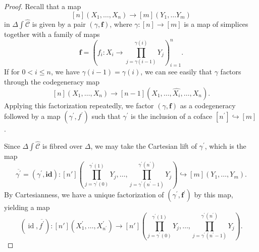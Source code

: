 \documentclass[leqno]{article}
\numberwithin{equation}{subsection}
\theoremstyle{plain}   %
\theoremstyle{remark}
\theoremstyle{plain}
\DeclareMathOperator{\id}{id}
\newcommand{\psh}[1]{\ensuremath{\widehat{#1}}}
\providecommand{\C}{}
\renewcommand{\C}{\ensuremath{\mathcal{C}}}
\begin{document}
\begin{proof}
	Recall that a map \[[n](X_1,\dots, X_n) \to [m](Y_1,\dots Y_m)\] in \(\Delta \int \psh{\C}\) is given by a pair \((\gamma,	\mathbf{f})\), where \(\gamma:[n]\to [m]\) is a map of simplices together with a family of maps \[\mathbf{f}=\left(f_i: 	X_i \to \prod_{j=\gamma(i-1)}^{\gamma(i)}Y_j\right)_{i=1}^n.\]
	If for \(0<i\leq n\), we have \(\gamma(i-1)=\gamma(i)\), we can see easily that \(\gamma\) factors through the 	codegeneracy map \[[n](X_1,\dots,X_n)\to [n-1](X_1,\dots,\psh{X_i},\dots,X_n).\]  Applying this factorization repeatedly, 	we factor \((\gamma,\mathbf{f})\) as a codegeneracy followed by a map \((\gamma^\prime,f^\prime)\) such that \(\gamma^\prime\) is the inclusion of a coface \([n^\prime]\hookrightarrow [m]\).

	Since \(\Delta\int \psh{\C}\) is fibred over \(\Delta\), we may take the Cartesian lift of \(\gamma^\prime\), which is 	the map \[\overline{\gamma^\prime}=(\gamma^\prime,\mathbf{id}):[n']\left(\prod_{j=\gamma^\prime(0)}^{\gamma^\prime(1)}Y_j,	 \dots, \prod_{j=\gamma^\prime(n^\prime-1)}^{\gamma^\prime(n^\prime)} Y_j \right)\hookrightarrow [m](Y_1,\dots,Y_m).\]  	By Cartesianness, we have a unique factorization of \((\gamma^\prime,\mathbf{f^\prime})\) by this map, yielding a map \[	(\id,\overline{f^\prime}):[n'](X^\prime_1,\dots,X^\prime_{n^\prime})\to [n']\left(\prod_{j=\gamma^\prime(0)}^	{\gamma^\prime(1)}Y_j, \dots, \prod_{j=\gamma^\prime(n^\prime-1)}^{\gamma^\prime(n^\prime)} Y_j \right).\]


\end{proof}
\end{document}
